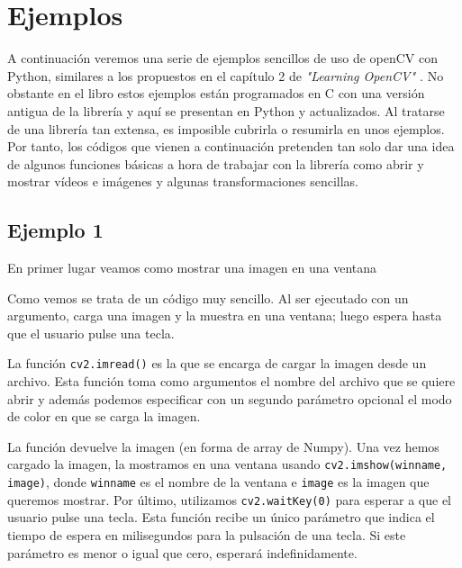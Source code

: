 \documentclass[a4paper,openright, 12pt]{book}
\begin{document}
\section{Ejemplos}
A continuación veremos una serie de ejemplos sencillos de uso de openCV con Python, similares a los propuestos en el capítulo 2 de \textit{"Learning OpenCV" \cite{oreilly}}. No obstante en el libro estos ejemplos están programados en C con una versión antigua de la librería y aquí se presentan en Python y actualizados. Al tratarse de una librería tan extensa, es imposible cubrirla o resumirla en unos ejemplos. Por tanto, los códigos que vienen a continuación pretenden tan solo dar una idea de algunos funciones básicas a hora de trabajar con la librería como abrir y mostrar vídeos e imágenes y algunas transformaciones sencillas.
\subsection*{Ejemplo 1}
En primer lugar veamos como mostrar una imagen en una ventana

Como vemos se trata de un código muy sencillo. Al ser ejecutado con un argumento, carga una imagen y la muestra en una ventana; luego espera hasta que el usuario pulse una tecla.

La función \lstinline|cv2.imread()| es la que se encarga de cargar la imagen desde un archivo.  Esta función toma como argumentos el nombre del archivo que se quiere abrir y además podemos especificar con un segundo parámetro opcional el modo de color en que se carga la imagen.

La función devuelve la imagen (en forma de array de Numpy).
\newline
Una vez hemos cargado la imagen, la mostramos en una ventana usando \lstinline|cv2.imshow(winname, image)|, donde \lstinline|winname| es el nombre de la ventana e \lstinline|image| es la imagen que queremos mostrar.
Por último, utilizamos \lstinline|cv2.waitKey(0)| para esperar a que el usuario pulse una tecla. Esta función recibe un único parámetro que indica el tiempo de espera en milisegundos para la pulsación de una tecla. Si este parámetro es menor o igual que cero, esperará indefinidamente.
\end{document}
